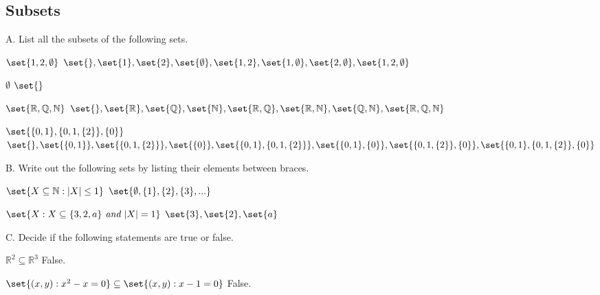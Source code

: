 \documentclass[DIN, pagenumber=false, fontsize=11pt, parskip=half]{scrartcl}
\begin{document}
\subsection{Subsets}

\begin{exercise}{A.}
    List all the subsets of the following sets.
\end{exercise}

\begin{problems}
    \problem $\set{1,2,\emptyset}$
    \answer  $\set{}, \set{1}, \set{2}, \set{\emptyset}, \set{1,2}, \set{1,\emptyset}, \set{2, \emptyset}, \set{1,2,\emptyset}$

    \problem $\emptyset$
    \answer  $\set{}$

    \problem $\set{\mathbb{R}, \mathbb{Q}, \mathbb{N}}$
    \answer  $\set{}, \set{\mathbb{R}}, \set{\mathbb{Q}}, \set{\mathbb{N}},\set{\mathbb{R},\mathbb{Q}}, \set{\mathbb{R}, \mathbb{N}}, \set{\mathbb{Q},\mathbb{N}}, \set{\mathbb{R}, \mathbb{Q}, \mathbb{N}}$

    \problem $\set{\{0,1\}, \{0,1,\{2\}\},\{0\}}$
    \answer  $\set{}, \set{\{0,1\}}, \set{\{0,1,\{2\}\}}, \set{\{0\}},\\
             \set{\{0,1\}, \{0,1,\{2\}\}}, \set{\{0,1\}, \{0\}}, \set{\{0,1,\{2\}\}, \{0\}}, \set{\{0,1\}, \{0,1,\{2\}\},\{0\}}$
\end{problems}

\begin{exercise}{B.}
    Write out the following sets by listing their elements between braces.
\end{exercise}

\begin{problems}[from=10]
    \problem $\set{X \subseteq \mathbb{N} : \abs{X} \leq 1}$
    \answer  $\set{\emptyset, \{1\}, \{2\}, \{3\}, ...}$

    \problem $\set{X : X \subseteq \{3,2,a\} \textit{ and } \abs{X} = 1}$
    \answer  $\set{3}, \set{2}, \set{a}$
\end{problems}

\begin{exercise}{C.}
    Decide if the following statements are true or false.
\end{exercise}

\begin{problems}[from=14]
    \problem $\mathbb{R}^2 \subseteq \mathbb{R}^3$
    \answer  False.

    \problem $\set{(x,y) : x^2 - x = 0} \subseteq \set{(x,y) : x - 1 = 0}$
    \answer  False.
\end{problems}
\end{document}
